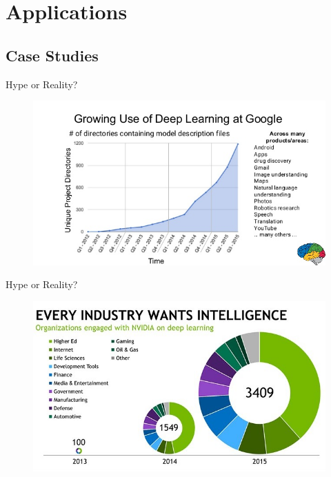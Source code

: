 \documentclass[10pt]{beamer}
\begin{document}
	\section{Applications}
	\subsection{Case Studies}
	\begin{frame}[c]{Hype or Reality?}
		\pause
		\begin{figure}
			\includegraphics[width=\linewidth]{images/cs_google}
		\end{figure}
	\end{frame}
	\begin{frame}{Hype or Reality?}
		\begin{figure}
			\includegraphics[width=\linewidth]{images/cs_nvidia}
		\end{figure}
	\end{frame}
\end{document}

